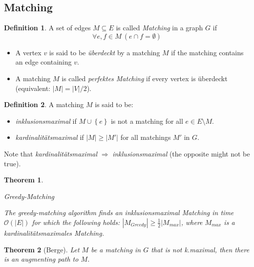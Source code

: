 \documentclass[12pt]{extarticle}
\theoremstyle{definition}
\newtheorem{definition}{Definition}
\theoremstyle{remark}
\theoremstyle{plain}
\newtheorem{theorem}{Theorem}
\theoremstyle{plain}
\theoremstyle{plain}
\newcommand{\BO}{\mathcal{O}}
\begin{document}
\subsection{Matching}

\begin{definition}
    A set of edges $M \subseteq E$ is called \textit{Matching} in a graph $G$ if
    \[ \forall e,f \in M\ (e \cap f = \emptyset) \]

    \begin{itemize}
        \item A vertex $v$ is said to be \textit{überdeckt} by a matching $M$ if the matching contains an edge containing $v$.
        \item A matching $M$ is called \textit{perfektes Matching} if every vertex is überdeckt (equivalent: $|M| = |V| / 2$).
    \end{itemize}
\end{definition}

\begin{definition}
    A matching $M$ is said to be:
    \begin{itemize}
        \item \textit{inklusionsmaximal} if $M \cup \left\{ e \right\}$ is not a matching for all $e \in E \setminus M$.
        \item \textit{kardinalitätsmaximal} if $|M| \ge |M'|$ for all matchings $M'$ in $G$.
    \end{itemize}

    Note that \textit{kardinalitätsmaximal} $\Rightarrow$ \textit{inklusionsmaximal} (the opposite might not be true).
\end{definition}

\begin{theorem}
    \begin{algorithm}
        \caption{Greedy-Matching}
    \end{algorithm}

    The greedy-matching algorithm finds an inklusionsmaximal Matching in time $\BO(|E|)$
    for which the following holds: $|M_{Greedy}| \ge \frac{1}{2} |M_{max}|$, where $M_{max}$ is a kardinalitätsmaximales Matching.
\end{theorem}

\begin{theorem}[Berge]
    Let $M$ be a matching in $G$ that is not k.maximal, then there is an augmenting path to $M$.
\end{theorem}
\end{document}
